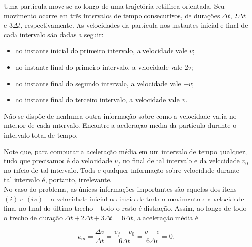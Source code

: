 \begin{exemplo}[Nível II]\label{exemplo_cinematicaescalar_aceleracaomedia02}



Uma partícula move-se ao longo de uma trajetória retilínea orientada. Seu movimento ocorre em três intervalos de tempo consecutivos, de durações $\Delta t$, $2\Delta t$ e $3\Delta t$, respectivamente. As velocidades da partícula nos instantes inicial e final de cada intervalo são dadas a seguir:

\begin{itemize}
  \item [(i)] no instante inicial do primeiro intervalo, a velocidade vale $v$;
  \item [(ii)] no instante final do primeiro intervalo, a velocidade vale $2v$;
  \item [(iii)] no instante final do segundo intervalo, a velocidade vale $-v$;
  \item [(iv)] no instante final do terceiro intervalo, a velocidade vale $v$.
\end{itemize}

Não se dispõe de nenhuma outra informação sobre como a velocidade varia no interior de cada intervalo. Encontre a aceleração média da partícula durante o intervalo total de tempo.



\resolucao



Note que, para computar a aceleração média em um intervalo de tempo qualquer, tudo que precisamos é da velocidade $v_f$ no final de tal intervalo e da velocidade $v_0$ no início de tal intervalo. Toda e qualquer informação sobre velocidade durante tal intervalo é, portanto, irrelevante. \\

No caso do problema, as únicas informações importantes são aquelas dos itens $(i)$ e $(iv)$ -- a velocidade inicial no início de todo o movimento e a velocidade final no final do último trecho -- todo o resto é distração. Assim, ao longo de todo o trecho de duração $\Delta t+ 2\Delta t+3\Delta t = 6\Delta t$, a aceleração média é

$$ a_m = \dfrac{\Delta v}{\Delta t} = \dfrac{v_f-v_0}{6 \Delta t} = \dfrac{v-v}{6 \Delta t} = 0.$$

  

    
\end{exemplo}



\vspace{0.3cm}






















